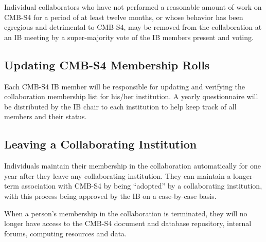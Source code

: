 Individual collaborators who have not performed a reasonable amount of work on CMB-S4 for a period of at least twelve months, or whose behavior has been egregious and detrimental to CMB-S4, may be removed from the collaboration at an IB meeting by a super-majority vote of the IB members present and voting.

\subsection{Updating CMB-S4 Membership Rolls}

Each CMB-S4 IB member will be responsible for updating and verifying the collaboration membership list for his/her institution. A yearly questionnaire will be distributed by the IB chair to each institution to help keep track of all members and their status.

\subsection{Leaving a Collaborating Institution}

Individuals maintain their membership in the collaboration automatically for one year after they leave any collaborating institution. They can maintain a longer-term association with CMB-S4 by being ``adopted'' by a collaborating institution, with this process being approved by the IB on a case-by-case basis.

When a person's membership in the collaboration is terminated, they will no longer have access to the CMB-S4 document and database repository, internal forums, computing resources and data.



